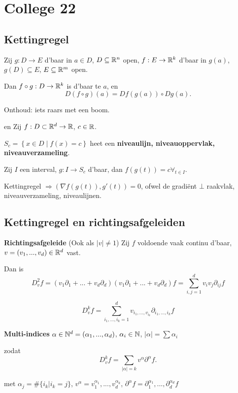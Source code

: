 \documentclass{2wa40summary}
\begin{document}
	\newpage
	\section{College 22}
		\subsection{Kettingregel}
			\theorem Zij $g:D \to E$ d'baar in $a \in D$, $D \subseteq \mathbb{R}^n$ open, $f:E \to \mathbb{R}^k$ d'baar in $g(a)$, $g(D) \subseteq E$, $E \subseteq \mathbb{R}^m$ open.
			
			Dan $f\circ g:D\to \mathbb{R}^k$ is d'baar te $a$, en \[ D(f \circ g)(a) = Df(g(a))\circ Dg(a). \]
			
			Onthoud: iets raars met een boom.
			
			\gevolg en  Zij $f:D \subset \mathbb{R}^d \to \mathbb{R}$, $c \in \mathbb{R}$. 
			
			$S_c = \left\{ x\in D \middle| f(x)=c \right\}$ heet een \textbf{niveaulijn, niveauoppervlak, niveauverzameling}.
			
			Zij $I$ een interval, $g: I\to S_c$ d'baar, dan $f(g(t))=c \forall_{t \in I}$.
			
			\opm Kettingregel $\Rightarrow (\nabla f(g(t)),g'(t)) = 0$, ofwel de gradi\"ent $\bot$ raakvlak, niveauverzameling, niveaulijnen.
			
		\subsection{Kettingregel en richtingsafgeleiden}
			
			 \textbf{Richtingsafgeleide} (Ook als $|v|\neq 1$)
			Zij $f$ voldoende vaak continu d'baar, $v=(v_1,...,v_d) \in \mathbb{R}^d$ vast.
			
			Dan is \[ D_v^2 f = (v_1 \partial_1 + ... + v_d \partial_d)(v_1 \partial_1 + ... + v_d \partial_d)f = \sum_{i,j=1}^{d} v_i v_j \partial_{ij}f \]
			
			\[ D_v^k f = \sum_{i_1,...,i_k=1}^{d} v_{{i_1},...,v_{i_k}} \partial_{i_1,...,i_k} f \]
			
			\nota \textbf{Multi-indices} $ \alpha \in \mathbb{N}^d = (\alpha_1 ,..., \alpha_d) $, $\alpha_i \in \mathbb{N}$, $ |\alpha| = \sum \alpha_i $
			
			zodat \[ D_v^k f = \sum_{|\alpha|=k} v^\alpha \partial^\alpha f. \]
			
			met $ \alpha_j = \#\{i_k | i_k = j\} $, $ v^\alpha = v_1^{\alpha_1} ,..., v_d^{\alpha_k} $, $ \partial^\alpha f = \partial_1^{\alpha_1},...,\partial_d^{\alpha_d} f $
			
\end{document}
